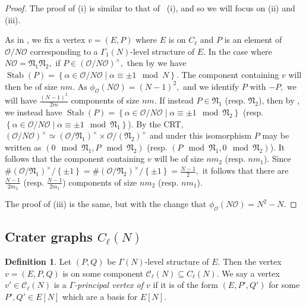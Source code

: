 \documentclass[11pt,a4paper]{amsart}
\theoremstyle{plain}
\theoremstyle{definition}
\newtheorem{defn}[thm]{Definition}
\theoremstyle{remark}
\DeclareMathOperator{\Stab}{Stab}
\begin{document}
\begin{proof}
  The proof of (i) is similar to that of ~(i), and so we will focus on (ii) and (iii).

  As in , we fix a vertex $v = (E, P)$ where $E$ is on $C_{\ell}$ and $P$ is an element of $\mathcal{O}/N\mathcal{O}$ corresponding to a $\Gamma_1(N)$-level structure of $E.$ In the case where $N\mathcal{O} = \mathfrak{N}_1 \mathfrak{N}_2,$ if $P \in (\mathcal{O}/N\mathcal{O})^{\times},$ then by  we have $\Stab(P) = \left\{ \alpha \in \mathcal{O}/N \mathcal{O} \mid \alpha \equiv \pm 1 \mod N \right\}.$ The component containing $v$ will then be of size $nm.$ As $\phi_{\mathcal{O}}(N \mathcal{O}) = (N-1)^2,$ and we identify $P$ with $-P,$ we will have $\frac{(N-1)^2}{2m}$ components of size $nm.$ If instead $P \in \mathfrak{N}_1$ (resp. $\mathfrak{N}_2$), then by , we instead have $\Stab(P) = \left\{ \alpha \in \mathcal{O}/N \mathcal{O} \mid \alpha \equiv \pm 1 \mod{\mathfrak{N}_2} \right\}$ (resp. $\left\{ \alpha \in \mathcal{O}/N \mathcal{O} \mid \alpha \equiv \pm 1 \mod{\mathfrak{N}_1} \right\}$). By the CRT, $(\mathcal{O}/N\mathcal{O})^{\times} \simeq (\mathcal{O}/\mathfrak{N}_1)^{\times} \times \mathcal{O}/(\mathfrak{N}_2)^{\times}$ and under this isomorphism $P$ may be written as $(0 \mod{\mathfrak{N}_{1}}, P \mod{\mathfrak{N}_2})$ (resp. $(P \mod{\mathfrak{N}_1}, 0 \mod{\mathfrak{N}_{2}})$). It follows that the component containing $v$ will be of size $nm_2$ (resp. $nm_1$). Since $\# (\mathcal{O}/\mathfrak{N}_1)^{\times}/\left\{ \pm 1 \right\} = \#(\mathcal{O}/\mathfrak{N}_2)^{\times}/\left\{ \pm 1 \right\} = \frac{N-1}{2},$ it follows that there are $\frac{N-1}{2m_2}$ (resp. $\frac{N-1}{2m_1}$) components of size $nm_2$ (resp. $nm_1$).

  The proof of (iii) is the same, but with the change that $\phi_{\mathcal{O}}(N \mathcal{O}) = N^2-N.$
\end{proof}

\subsection{Crater graphs $C_{\ell}(N)$}
\begin{defn}\label{defn:principal-vertex-full}
  Let $(P, Q)$ be $\Gamma(N)$-level structure of $E.$ Then the vertex $v = (E, P, Q)$ is on some component $\mathcal{C}_{\ell}(N) \subseteq C_{\ell}(N).$ We say a vertex $v' \in \mathcal{C}_{\ell}(N)$ is a \emph{$\Gamma$-principal vertex of $v$} if it is of the form $(E, P', Q')$ for some $P', Q' \in E[N]$ which are a basis for $E[N].$
\end{defn}
\end{document}
